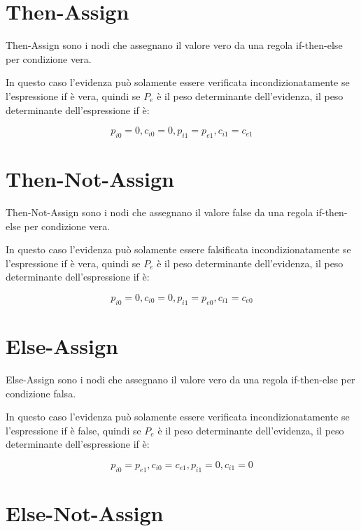 \documentclass{article}
\begin{document}
  \section{Then-Assign}
  
  Then-Assign sono i nodi che assegnano il valore vero da una regola
  if-then-else per condizione vera.
  
  In questo caso l'evidenza pu\`o solamente essere verificata
  incondizionatamente se l'espressione if \`e vera, quindi se $P_e$ \`e il peso
  determinante dell'evidenza, il peso determinante dell'espressione if \`e:
  
  \begin{equation}
    p_{i0}=0, c_{i0}=0, p_{i1}=p_{e1}, c_{i1}=c_{e1}
  \end{equation}
  
  \section{Then-Not-Assign}
  
  Then-Not-Assign sono i nodi che assegnano il valore false da una regola
  if-then-else per condizione vera.
  
  In questo caso l'evidenza pu\`o solamente essere falsificata
  incondizionatamente se l'espressione if \`e vera, quindi se $P_e$ \`e il peso
  determinante dell'evidenza, il peso determinante dell'espressione if \`e:
  
  \begin{equation}
    p_{i0}=0, c_{i0}=0, p_{i1}=p_{e0}, c_{i1}=c_{e0}
  \end{equation}
  
  \section{Else-Assign}
  
  Else-Assign sono i nodi che assegnano il valore vero da una regola
  if-then-else per condizione falsa.
  
  In questo caso l'evidenza pu\`o solamente essere verificata
  incondizionatamente se l'espressione if \`e false, quindi se $P_e$ \`e il
  peso determinante dell'evidenza, il peso determinante dell'espressione if
  \`e:
  
  \begin{equation}
      p_{i0}=p_{e1}, c_{i0}=c_{e1}, p_{i1}=0, c_{i1}=0
  \end{equation}
  
  \section{Else-Not-Assign}
  
\end{document}
